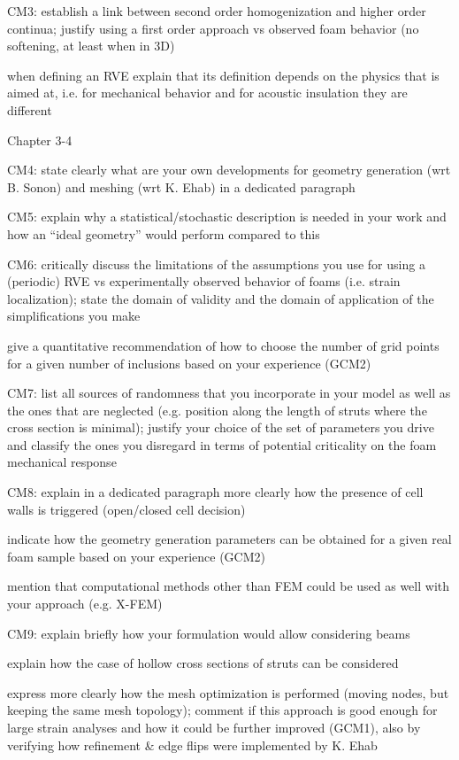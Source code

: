 CM3: establish a link between second order homogenization and higher order
continua; justify using a first order approach vs observed foam behavior (no
softening, at least when in 3D)

when defining an RVE explain that its definition depends on the physics that is
aimed at, i.e. for mechanical behavior and for acoustic insulation they are different

Chapter 3-4

CM4: state clearly what are your own developments for geometry generation (wrt B.
Sonon) and meshing (wrt K. Ehab) in a dedicated paragraph

CM5: explain why a statistical/stochastic description is needed in your work and
how an “ideal geometry” would perform compared to this

CM6: critically discuss the limitations of the assumptions you use for using a
(periodic) RVE vs experimentally observed behavior of foams (i.e. strain
localization); state the domain of validity and the domain of application of the
simplifications you make

give a quantitative recommendation of how to choose the number of grid points for
a given number of inclusions based on your experience (GCM2)

CM7: list all sources of randomness that you incorporate in your model as well as
the ones that are neglected (e.g. position along the length of struts where the cross
section is minimal); justify your choice of the set of parameters you drive and
classify the ones you disregard in terms of potential criticality on the foam
mechanical response

CM8: explain in a dedicated paragraph more clearly how the presence of cell walls
is triggered (open/closed cell decision)

indicate how the geometry generation parameters can be obtained for a given real
foam sample based on your experience (GCM2)

mention that computational methods other than FEM could be used as well with
your approach (e.g. X-FEM)

CM9: explain briefly how your formulation would allow considering beams

explain how the case of hollow cross sections of struts can be considered

express more clearly how the mesh optimization is performed (moving nodes, but
keeping the same mesh topology); comment if this approach is good enough for
large strain analyses and how it could be further improved (GCM1), also by
verifying how refinement & edge flips were implemented by K. Ehab

